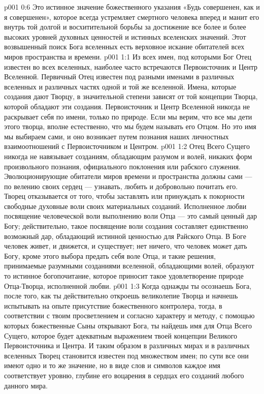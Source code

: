 \vs p001 0:6 Это истинное значение божественного указания «Будь совершенен, как и я совершенен», которое всегда устремляет смертного человека вперед и манит его внутрь той долгой и восхитительной борьбы за достижение все более и более высоких уровней духовных ценностей и истинных вселенских значений. Этот возвышенный поиск Бога вселенных есть верховное искание обитателей всех миров пространства и времени.
\vs p001 1:1 Из всех имен, под которыми Бог Отец известен во всех вселенных, наиболее часто встречаются Первоисточник и Центр Вселенной. Первичный Отец известен под разными именами в различных вселенных и различных частях одной и той же вселенной. Имена, которые создания дают Творцу, в значительной степени зависят от той концепции Творца, которой обладают эти создания. Первоисточник и Центр Вселенной никогда не раскрывает себя по имени, только по природе. Если мы верим, что все мы дети этого творца, вполне естественно, что мы будем называть его Отцом. Но это имя мы выбираем сами, и оно возникает путем познания наших личностных взаимоотношений с Первоисточником и Центром.
\vs p001 1:2 Отец Всего Сущего никогда не навязывает созданиям, обладающим разумом и волей, никаких форм произвольного познания, официального поклонения или рабского служения. Эволюционирующие обитатели миров времени и пространства должны сами --- по велению своих сердец --- узнавать, любить и добровольно почитать его. Творец отказывается от того, чтобы заставлять или принуждать к покорности свободные духовные воли своих материальных созданий. Исполненное любви посвящение человеческой воли выполнению воли Отца --- это самый ценный дар Богу; действительно, такое посвящение воли создания составляет единственно возможный дар, обладающий истинной ценностью для Райского Отца. В Боге человек живет, и движется, и существует; нет ничего, что человек может дать Богу, кроме этого выбора предать себя воле Отца, и такие решения, принимаемые разумными созданиями вселенной, обладающими волей, образуют то истинное богопочитание, которое приносит такое удовлетворение природе Отца\hyp{}Творца, исполненной любви.
\vs p001 1:3 Когда однажды ты осознаешь Бога, после того, как ты действительно откроешь великолепие Творца и начнешь испытывать на опыте присутствие божественного контролера, тогда, в соответствии с твоим просветлением и согласно характеру и методу, с помощью которых божественные Сыны открывают Бога, ты найдешь имя для Отца Всего Сущего, которое будет адекватным выражением твоей концепции Великого Первоисточника и Центра. И таким образом в различных мирах и в различных вселенных Творец становится известен под множеством имен; по сути все они имеют одно и то же значение, но в виде слов и символов каждое имя соответствует уровню, глубине его воцарения в сердцах его созданий любого данного мира.

